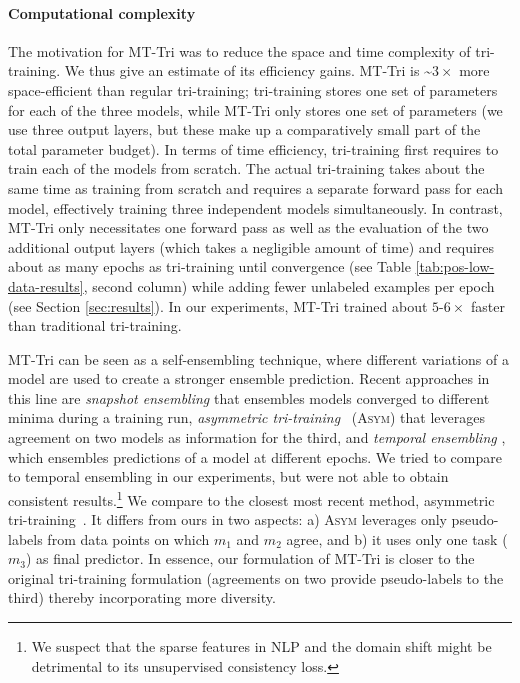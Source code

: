 \documentclass[11pt,a4paper]{article}
\begin{document}
\paragraph{Computational complexity} The motivation for MT-Tri was to reduce the space and time complexity of tri-training. We thus give an estimate of its efficiency gains. MT-Tri is \textasciitilde$3\times$ more space-efficient than regular tri-training; tri-training stores one set of parameters for each of the three models, while MT-Tri only stores one set of parameters (we use three output layers, but these make up a comparatively small part of the total parameter budget). In terms of time efficiency, tri-training first requires to train each of the models from scratch. The actual tri-training takes about the same time as training from scratch and requires a separate forward pass for each model, effectively training three independent models simultaneously. In contrast, MT-Tri only necessitates one forward pass as well as the evaluation of the two additional output layers (which takes a negligible amount of time) and requires about as many epochs as tri-training until convergence (see Table \ref{tab:pos-low-data-results}, second column) while adding fewer unlabeled examples per epoch (see Section \ref{sec:results}). In our experiments, MT-Tri trained about $5$-$6\times$ faster than traditional tri-training.

MT-Tri can be seen as a self-ensembling technique, where different variations of a model are used to create a stronger ensemble prediction. Recent approaches in this line are \textit{snapshot ensembling} \cite{Huang2017c} that ensembles models converged to different minima during a training run, \textit{asymmetric tri-training}~\cite{Saito2017} (\textsc{Asym}) that leverages agreement on two models as information for the third, and \textit{temporal ensembling} \cite{Laine2017}, which ensembles predictions of a model at different epochs. We tried to compare to temporal ensembling in our experiments, but were not able to obtain consistent results.\footnote{We suspect that the sparse features in NLP and the domain shift might be detrimental to its unsupervised consistency loss.} We compare to the closest most recent method, asymmetric tri-training~\cite{Saito2017}. It differs from ours in two aspects: a) \textsc{Asym} leverages only pseudo-labels from data points on which $m_1$ and $m_2$ agree, and b) it uses only one task ($m_3$) as final predictor. In essence, our formulation of MT-Tri is closer to the original tri-training formulation (agreements on two provide pseudo-labels to the third) thereby incorporating more diversity.
\end{document}
